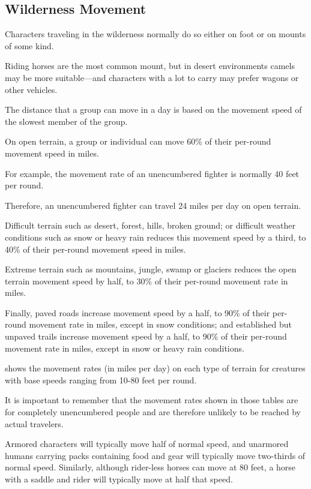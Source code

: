\begin{multicols*}{2}
\section{Wilderness Movement}
Characters traveling in the wilderness normally do so either on foot or on mounts of some kind.

Riding horses are the most common mount, but in desert environments camels may be more suitable—and characters with a lot to carry may prefer wagons or other vehicles.

The distance that a group can move in a day is based on the movement speed of the slowest member of the group.

On open terrain, a group or individual can move 60\% of their per-round movement speed in miles.

For example, the movement rate of an unencumbered fighter is normally 40 feet per round.

Therefore, an unencumbered fighter can travel 24 miles per day on open terrain.

Difficult terrain such as desert, forest, hills, broken ground; or difficult weather conditions such as snow or heavy rain reduces this movement speed by a third, to 40\% of their per-round movement speed in miles.

Extreme terrain such as mountains, jungle, swamp or glaciers reduces the open terrain movement speed by half, to 30\% of their per-round movement rate in miles.

Finally, paved roads increase movement speed by a half, to 90\% of their per-round movement rate in miles, except in snow conditions; and established but unpaved trails increase movement speed by a half, to 90\% of their per-round movement rate in miles, except in snow or heavy rain conditions.

 shows the movement rates (in miles per day) on each type of terrain for creatures with base speeds ranging from 10-80 feet per round.

It is important to remember that the movement rates shown in those tables are for completely unencumbered people and are therefore unlikely to be reached by actual travelers.

Armored characters will typically move half of normal speed, and unarmored humans carrying packs containing food and gear will typically move two-thirds of normal speed. Similarly, although rider-less horses can move at 80 feet, a horse with a saddle and rider will typically move at half that speed.


\end{multicols*}
